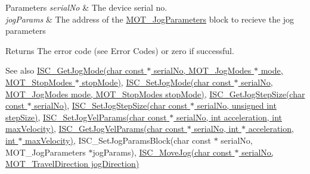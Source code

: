 \begin{DoxyParams}{Parameters}
{\em serial\+No} & The device serial no. \\
\hline
{\em jog\+Params} & The address of the \hyperlink{struct_m_o_t___jog_parameters}{M\+O\+T\+\_\+\+Jog\+Parameters} block to recieve the jog parameters \\
\hline
\end{DoxyParams}
\begin{DoxyReturn}{Returns}
The error code (see Error Codes) or zero if successful. 
\end{DoxyReturn}
\begin{DoxySeeAlso}{See also}
\hyperlink{group___integrated_stepper_motors_gaab2198da230c8a2c532c644958fd673b}{I\+S\+C\+\_\+\+Get\+Jog\+Mode(char const $\ast$ serial\+No, M\+O\+T\+\_\+\+Jog\+Modes $\ast$ mode, M\+O\+T\+\_\+\+Stop\+Modes $\ast$ stop\+Mode)}, \hyperlink{group___integrated_stepper_motors_ga13d248af45e7b14fd4dde2c2d403e262}{I\+S\+C\+\_\+\+Set\+Jog\+Mode(char const $\ast$ serial\+No, M\+O\+T\+\_\+\+Jog\+Modes mode, M\+O\+T\+\_\+\+Stop\+Modes stop\+Mode)}, \hyperlink{group___integrated_stepper_motors_gaaced0eae4d9e787711102fb2d388c4ac}{I\+S\+C\+\_\+\+Get\+Jog\+Step\+Size(char const $\ast$ serial\+No)}, \hyperlink{group___integrated_stepper_motors_ga3a5ad9b0ffc60c9f7e821b11c7a844b5}{I\+S\+C\+\_\+\+Set\+Jog\+Step\+Size(char const $\ast$ serial\+No, unsigned int step\+Size)}, \hyperlink{group___integrated_stepper_motors_ga43510de1088ba16f4a718cd66ee9368d}{I\+S\+C\+\_\+\+Set\+Jog\+Vel\+Params(char const $\ast$ serial\+No, int acceleration, int max\+Velocity)}, \hyperlink{group___integrated_stepper_motors_ga375530d0ec2239a526f22574da6b6968}{I\+S\+C\+\_\+\+Get\+Jog\+Vel\+Params(char const $\ast$ serial\+No, int $\ast$ acceleration, int $\ast$ max\+Velocity)}, I\+S\+C\+\_\+\+Set\+Jog\+Params\+Block(char const $\ast$ serial\+No, M\+O\+T\+\_\+\+Jog\+Parameters $\ast$jog\+Params), \hyperlink{group___integrated_stepper_motors_gaecadeb580793b1296eba22b3f9ad3927}{I\+S\+C\+\_\+\+Move\+Jog(char const $\ast$ serial\+No, M\+O\+T\+\_\+\+Travel\+Direction jog\+Direction)}


\end{DoxySeeAlso}

\begin{DoxyCodeInclude}
\end{DoxyCodeInclude}

